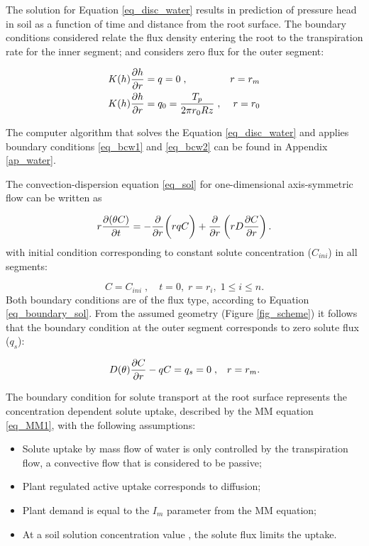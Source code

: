 The solution for Equation \ref{eq_disc_water} results in prediction of pressure head in soil as a function of time and distance from the root surface. 
The boundary conditions considered relate the flux density entering the root to the transpiration rate for the inner segment; and considers zero flux for the outer segment:

\begin{align}
  \label{eq_bcw1}
  K(h) {\partial h \over \partial r} &= q = 0\;{\rm ,} &r=r_m \\
  \label{eq_bcw2}
  K(h) {\partial h \over \partial r} &= q_0 = {T_p \over 2 \pi r_0 R z}\;{\rm ,} &r=r_0   
\end{align}

The computer algorithm that solves the Equation \ref{eq_disc_water} and applies boundary conditions \ref{eq_bcw1} and \ref{eq_bcw2} can be found in Appendix \ref{ap_water}.

The convection-dispersion equation \ref{eq_sol} for one-dimensional axis-symmetric flow can be written as

\label{eq_complete_solute}
\begin{equation}
r {\partial(\theta C) \over \partial t} = -{\partial \over \partial r} \biggl(r q C \biggr) + {\partial  \over \partial r} \left( r D {\partial C \over \partial r} \right).
\end{equation}
%
with initial condition corresponding to constant solute concentration ($C_{ini}$) in all segments:

\begin{equation}
C = C_{ini}\;, \quad t=0,\; r=r_i,\; 1 \leq i \leq n.
\end{equation}
%
Both boundary conditions are of the flux type, according to Equation \ref{eq_boundary_sol}.
From the assumed geometry (Figure \ref{fig_scheme}) it follows that the boundary condition at the outer segment corresponds to zero solute flux ($q_s$):

\begin{align}
  \label{eq_bcrm}
  D(\theta) {\partial C \over \partial r} - q C &= q_s = 0\;{\rm ,} &r=r_m.
\end{align}

The boundary condition for solute transport at the root surface represents the concentration dependent solute uptake, described by the MM equation \ref{eq_MM1}, with the following assumptions:
\begin{itemize}
\item  Solute uptake by mass flow of water is only controlled by the transpiration flow, a convective flow that is considered to be passive;
\item  Plant regulated active uptake corresponds to diffusion;
\item  Plant demand is equal to the $I_m$ parameter from the MM equation;
\item  At a soil solution concentration value \clim, the solute flux limits the uptake. 
\end{itemize}

